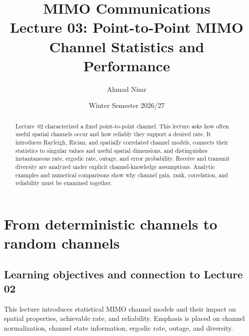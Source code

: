 


\providecommand{\RH}{R_{\ma{H}}}
\title{MIMO Communications\\Lecture 03: Point-to-Point MIMO Channel Statistics and Performance}
\author{Ahmad Nimr}
\date{Winter Semester 2026/27}



\acresetall
\maketitle
\begin{abstract}
Lecture~02 characterized a fixed point-to-point channel. This lecture asks how often useful spatial channels occur and how reliably they support a desired rate. It introduces Rayleigh, Rician, and spatially correlated channel models, connects their statistics to singular values and useful spatial dimensions, and distinguishes instantaneous rate, ergodic rate, outage, and error probability. Receive and transmit diversity are analyzed under explicit channel-knowledge assumptions. Analytic examples and numerical comparisons show why channel gain, rank, correlation, and reliability must be examined together.
\end{abstract}
\acresetall
\tableofcontents
\newpage

\section{From deterministic channels to random channels}
\label{sec:random}

\subsection{Learning objectives and connection to Lecture 02}

This lecture introduces statistical MIMO channel models
and their impact on spatial properties, achievable rate,
and reliability. Emphasis is placed on channel normalization,
channel state information, ergodic rate, outage, and diversity.

